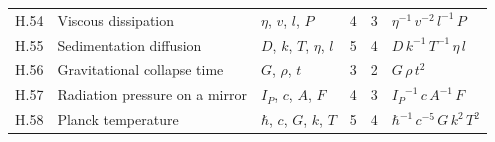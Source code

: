 {\begin{longtable}{@{}l>{\raggedright\arraybackslash}p{3.0cm}>{\raggedright\arraybackslash}p{3.6cm}rr>{\raggedright\arraybackslash}p{6.2cm}@{}}
H.54 & Viscous dissipation & $\eta$, $v$, $l$, $P$ & 4 & 3 & ${\eta}^{-1}\,{v}^{-2}\,{l}^{-1}\,P$ \\
H.55 & Sedimentation diffusion & $D$, $k$, $T$, $\eta$, $l$ & 5 & 4 & $D\,{k}^{-1}\,{T}^{-1}\,\eta\,l$ \\
H.56 & Gravitational collapse time & $G$, $\rho$, $t$ & 3 & 2 & $G\,\rho\,{t}^{2}$ \\
H.57 & Radiation pressure on a mirror & $I_P$, $c$, $A$, $F$ & 4 & 3 & ${I_P}^{-1}\,c\,{A}^{-1}\,F$ \\
H.58 & Planck temperature & $\hbar$, $c$, $G$, $k$, $T$ & 5 & 4 & ${\hbar}^{-1}\,{c}^{-5}\,G\,{k}^{2}\,{T}^{2}$ \\
\end{longtable}}
